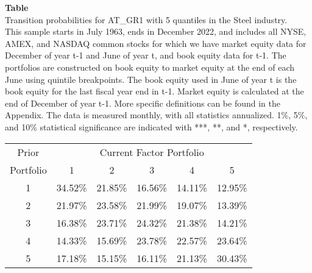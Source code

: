 \begin{table*}[ht!]
\raggedright
{}
\label{tab: transition_probs_AT_GR1_Steel_with_5_quantiles}
\textbf{Table \thetable} \\
Transition probabilities for AT_GR1 with 5 quantiles in the Steel industry. \\
\hspace*{1em}This sample starts in July 1963, ends in December 2022, and includes all NYSE, AMEX, and NASDAQ common stocks for which we have market equity data for December of year t-1 and June of year t, and book equity data for t-1. The portfolios are constructed on book equity to market equity at the end of each June using quintile breakpoints.  The book equity used in June of year t is the book equity for the last fiscal year end in t-1.  Market equity is calculated at the end of December of year t-1.  More specific definitions can be found in the Appendix.  The data is measured monthly, with all statistics annualized.  1\%, 5\%, and 10\% statistical significance are indicated with ***, **, and *, respectively. \\
\vspace{0.5em}
\centering
\begin{adjustbox}{max width=\textwidth}
\begin{tabular}{@{}cccccc@{}}
\toprule
Prior & \multicolumn{5}{c}{Current Factor Portfolio} \\
Portfolio & 1 & 2 & 3 & 4 & 5 \\
\midrule
1 & 34.52\% & 21.85\% & 16.56\% & 14.11\% & 12.95\% \\
2 & 21.97\% & 23.58\% & 21.99\% & 19.07\% & 13.39\% \\
3 & 16.38\% & 23.71\% & 24.32\% & 21.38\% & 14.21\% \\
4 & 14.33\% & 15.69\% & 23.78\% & 22.57\% & 23.64\% \\
5 & 17.18\% & 15.15\% & 16.11\% & 21.13\% & 30.43\% \\
\bottomrule
\end{tabular}
\end{adjustbox}
\end{table*}